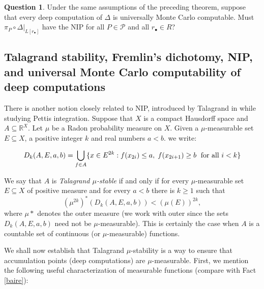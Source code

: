 \documentclass[psamsfonts]{amsart}
\theoremstyle{definition}
\newtheorem{question}[thm]{Question}
\theoremstyle{remark}
\numberwithin{equation}{section}
\begin{document}
\begin{question}
Under the same assumptions of the preceding theorem, suppose that every deep computation of $\Delta$ is universally Monte Carlo computable.
Must $\pi_P\circ\Delta|_{L[r_\bullet]}$ have the NIP for all $P\in\mathcal{P}$ and all $r_{\bullet}\in R$?
\end{question}

\subsection{Talagrand stability, Fremlin's dichotomy, NIP, and universal Monte Carlo computability of  deep computations}

There is another notion closely related to NIP, introduced by Talagrand in \cite{talagrand1984pettis} while studying Pettis integration.
Suppose that $X$ is a compact Hausdorff space and $A\subseteq \mathbb{R}^X$.
Let $\mu$ be a Radon probability measure on $X$.
Given a $\mu$-measurable set $E\subseteq X$, a positive integer $k$ and real numbers $a<b$.
we write:

$$D_k(A,E,a,b)=\bigcup_{f\in A}\{x\in E^{2k}:f(x_{2i})\leq a, \hspace{1mm} f(x_{2i+1})\geq b \hspace{1mm}{\text{ for all }i<k} \}$$

We say that $A$ is \emph{Talagrand $\mu$-stable} if and only if for every $\mu$-measurable set $E\subseteq X$ of positive measure and for every $a<b$ there is $k\geq 1$ such that
\[
(\mu^{2k})^*(D_k(A,E,a,b))<(\mu(E))^{2k},
\]
where $\mu*$ denotes the outer measure (we work with outer since the sets $D_k(A,E,a,b)$ need not be $\mu$-measurable).
This is certainly the case when $A$ is a countable set of continuous (or $\mu$-measurable) functions.

We shall now establish that Talagrand $\mu$-stability is a way to ensure that accumulation points (deep computations) are $\mu$-measurable.
First, we mention the following useful characterization of measurable functions (compare with Fact \ref{baire}):
\end{document}
